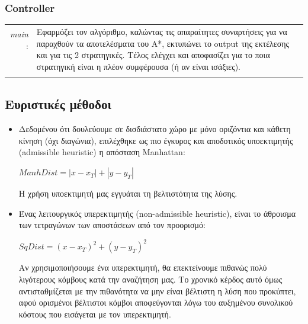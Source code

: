 \documentclass[a4paper,9pt]{article}
\begin{document}
\subsubsection{Controller}
\begin{tabular}{r l}
    \emph{main} :&\multirow{6}{10cm}{Εφαρμόζει τον αλγόριθμο, καλώντας τις απαραίτητες
	συναρτήσεις για να παραχθούν τα αποτελέσματα του A*, εκτυπώνει το output
	της εκτέλεσης και για τις 2 στρατηγικές. Τέλος ελέγχει και αποφασίζει για
	το ποια στρατηγική είναι η πλέον συμφέρουσα (ή αν είναι ισάξιες).}\\
	&\\&\\&\\&\\&\\&\\
\end{tabular}


\subsection{Ευριστικές μέθοδοι}
\begin{itemize}
    \item
        Δεδομένου ότι δουλεύουμε σε δισδιάστατο χώρο με μόνο οριζόντια και κάθετη
        κίνηση (όχι διαγώνια), επιλέχθηκε ως πιο έγκυρος και αποδοτικός υποεκτιμητής
        (admissible heuristic) η απόσταση Manhattan:
        \begin{center} $ManhDist = |x - x_T| + |y - y_T|$ \end{center}
        Η χρήση υποεκτιμητή μας εγγυάται τη βελτιστότητα της λύσης.

    \item
        Ένας λειτουργικός υπερεκτιμητής (non-admissible heuristic), είναι το άθροισμα
        των τετραγώνων των αποστάσεων από τον προορισμό:
        \begin{center} $SqDist = (x - x_T)^2 + (y - y_T)^2$ \end{center}
        Αν χρησιμοποιήσουμε ένα υπερεκτιμητή, θα επεκτείνουμε πιθανώς πολύ λιγότερους
        κόμβους κατά την αναζήτηση μας. Το χρονικό κέρδος αυτό όμως αντισταθμίζεται με
        την πιθανότητα να μην είναι βέλτιστη η λύση που προκύπτει, αφού ορισμένοι
        βέλτιστοι κόμβοι αποφεύγονται λόγω του αυξημένου συνολικού κόστους που
        εισάγεται με τον υπερεκτιμητή.
\end{itemize}
\end{document}
